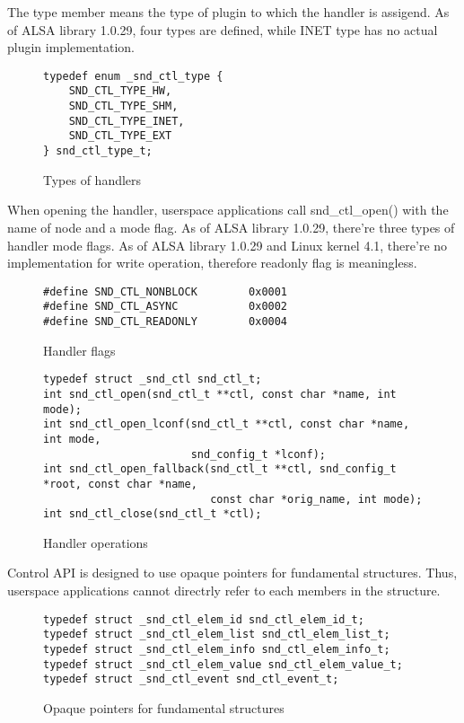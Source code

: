 \documentclass[onecolumn]{article}
\begin{document}
The type member means the type of plugin to which the handler is assigend. As of ALSA library 1.0.29, four types are defined, while INET type has no actual plugin implementation.

\begin{figure}[htbp]
\small
\begin{verbatim}
typedef enum _snd_ctl_type {
    SND_CTL_TYPE_HW,
    SND_CTL_TYPE_SHM,
    SND_CTL_TYPE_INET,
    SND_CTL_TYPE_EXT
} snd_ctl_type_t;
\end{verbatim}
\caption{{Types of handlers}}
\label{snd-ctl-type-t}
\end{figure}

When opening the handler, userspace applications call snd\_ctl\_open() with the name of node and a mode flag. As of ALSA library 1.0.29, there're three types of handler mode flags. As of ALSA library 1.0.29 and Linux kernel 4.1, there're no implementation for write operation, therefore readonly flag is meaningless.

\begin{figure}[htbp]
\small
\begin{verbatim}
#define SND_CTL_NONBLOCK		0x0001
#define SND_CTL_ASYNC			0x0002
#define SND_CTL_READONLY		0x0004
\end{verbatim}
\caption{{Handler flags}}
\label{handler-flags}
\end{figure}

\begin{figure}[htbp]
\small
\begin{verbatim}
typedef struct _snd_ctl snd_ctl_t;
int snd_ctl_open(snd_ctl_t **ctl, const char *name, int mode);
int snd_ctl_open_lconf(snd_ctl_t **ctl, const char *name, int mode,
                       snd_config_t *lconf);
int snd_ctl_open_fallback(snd_ctl_t **ctl, snd_config_t *root, const char *name,
                          const char *orig_name, int mode);
int snd_ctl_close(snd_ctl_t *ctl);
\end{verbatim}
\caption{{Handler operations}}
\label{handler-operations}
\end{figure}

Control API is designed to use opaque pointers for fundamental structures. Thus, userspace applications cannot directrly refer to each members in the structure.

\begin{figure}[htbp]
\small
\begin{verbatim}
typedef struct _snd_ctl_elem_id snd_ctl_elem_id_t;
typedef struct _snd_ctl_elem_list snd_ctl_elem_list_t;
typedef struct _snd_ctl_elem_info snd_ctl_elem_info_t;
typedef struct _snd_ctl_elem_value snd_ctl_elem_value_t;
typedef struct _snd_ctl_event snd_ctl_event_t;
\end{verbatim}
\caption{{Opaque pointers for fundamental structures}}
\label{opaque-pointers}
\end{figure}
\end{document}
